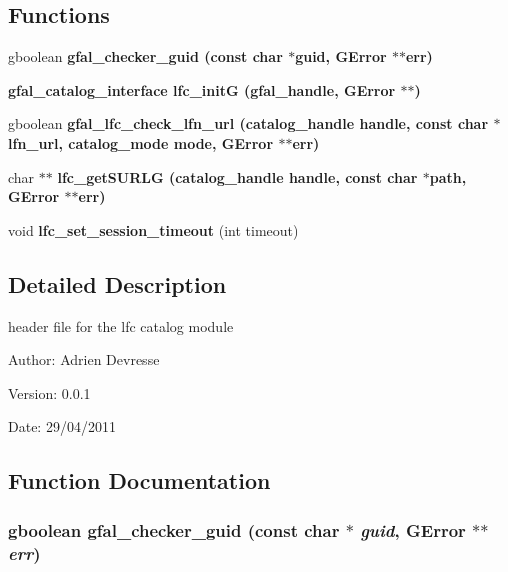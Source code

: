 \subsection*{Functions}
\begin{CompactItemize}
\item 
gboolean \bf{gfal\_\-checker\_\-guid} (const char $\ast$guid, GError $\ast$$\ast$err)
\item 
\bf{gfal\_\-catalog\_\-interface} \textbf{lfc\_\-init\-G} (gfal\_\-handle, GError $\ast$$\ast$)\label{gfal__common__lfc_8h_0d4af55002fa4216f9915b5a1a721ef4}

\item 
gboolean \bf{gfal\_\-lfc\_\-check\_\-lfn\_\-url} (catalog\_\-handle handle, const char $\ast$lfn\_\-url, catalog\_\-mode mode, GError $\ast$$\ast$err)
\item 
char $\ast$$\ast$ \bf{lfc\_\-get\-SURLG} (catalog\_\-handle handle, const char $\ast$path, GError $\ast$$\ast$err)
\item 
void \textbf{lfc\_\-set\_\-session\_\-timeout} (int timeout)\label{gfal__common__lfc_8h_656ee4eb29a1bcf4e9e1d9a4aafd4c82}

\end{CompactItemize}


\subsection{Detailed Description}
header file for the lfc catalog module 

\begin{Desc}
\item[Author:]Adrien Devresse \end{Desc}
\begin{Desc}
\item[Version:]0.0.1 \end{Desc}
\begin{Desc}
\item[Date:]29/04/2011 \end{Desc}


\subsection{Function Documentation}
\subsubsection{\setlength{\rightskip}{0pt plus 5cm}gboolean gfal\_\-checker\_\-guid (const char $\ast$ {\em guid}, GError $\ast$$\ast$ {\em err})}\label{gfal__common__lfc_8h_c7f9448e809d5c82f58288d1491dc2d0}


